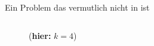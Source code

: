 \documentclass[navbaroff]{sdqbeamer}
\begin{document}
\begin{frame}[t]{Ein Problem das vermutlich nicht in \FPT ist}
\begin{overlayarea}{1\textwidth}{1\textheight}
\begin{columns}
\begin{column}{0.3\textwidth}
{\begin{figure}
                        (\textbf{hier:} $k = 4$)
                    \end{figure}
                }
            \end{column}
        \end{columns}
    \end{overlayarea}
\end{frame}
\end{document}
